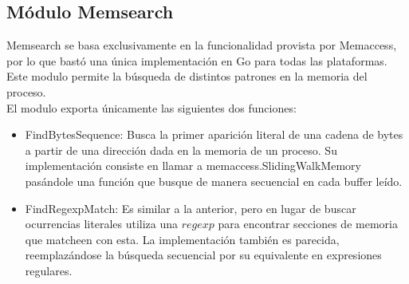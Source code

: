 \subsection{Módulo Memsearch}

Memsearch se basa exclusivamente en la funcionalidad provista por Memaccess,
por lo que bastó una única implementación en Go para todas las plataformas.
Este modulo permite la búsqueda de distintos patrones en la memoria del
proceso.\\

El modulo exporta únicamente las siguientes dos funciones:

\begin{itemize}

\item FindBytesSequence: Busca la primer aparición literal de una cadena de
bytes a partir de una dirección dada en la memoria de un proceso. Su
implementación consiste en llamar a memaccess.SlidingWalkMemory pasándole una
función que busque de manera secuencial en cada buffer leído.\\

\item FindRegexpMatch: Es similar a la anterior, pero en lugar de buscar
ocurrencias literales utiliza una $regexp$ para encontrar secciones de memoria
que matcheen con esta. La implementación también es parecida, reemplazándose la
búsqueda secuencial por su equivalente en expresiones regulares.\\

\end{itemize}

